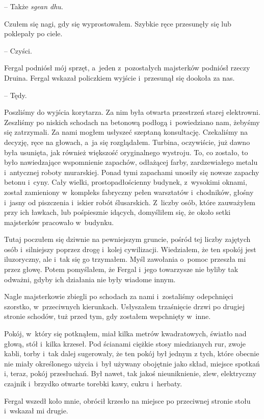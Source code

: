 \documentclass[oneside,polish,11pt,sfheadings]{mwbk}
\begin{document}
-- Także \textit{sgean dhu}.

Czułem się nagi, gdy się wyprostowałem. Szybkie ręce przesunęły się lub
poklepały po ciele.

-- Czyści.

Fergal podniósł mój sprzęt, a~jeden z~pozostałych majsterków podniósł
rzeczy Druina. Fergal wskazał policzkiem wyjście i~przesunął się dookoła
za nas.

-- Tędy.

Poszliśmy do wyjścia korytarza. Za nim była otwarta przestrzeń starej
elektrowni. Zeszliśmy po niskich schodach na betonową podłogą i~powiedziano nam, żebyśmy się zatrzymali. Za nami mogłem usłyszeć
szeptaną konsultację. Czekaliśmy na decyzję, ręce na głowach, a~ja się
rozglądałem. Turbina, oczywiście, już dawno była usunięta, jak również
większość oryginalnego wystroju. To, co zostało, to było nawiedzające
wspomnienie zapachów, odłażącej farby, zardzewiałego metalu i~antycznej
roboty murarskiej. Ponad tymi zapachami unosiły się nowsze zapachy
betonu i~cyny. Cały wielki, prostopadłościenny budynek, z~wysokimi
oknami, został zamieniony w~kompleks fabryczny pełen warsztatów i~chodników, głośny i~jasny od piszczenia i~iskier robót ślusarskich. Z~liczby osób, które zauważyłem przy ich ławkach, lub pośpiesznie idących,
domyśliłem się, że około setki majsterków pracowało w~budynku.

Tutaj poczułem się dziwnie na pewniejszym gruncie, pośród tej liczby
zajętych osób i~silniejszy poprzez drogę i~kolej cywilizacji.
Wiedziałem, że ten spokój jest iluzoryczny, ale i~tak się go trzymałem.
Myśl zawołania o~pomoc przeszła mi przez głowę. Potem pomyślałem, że
Fergal i~jego towarzysze nie byliby tak odważni, gdyby ich działania nie
były wiadome innym.

Nagle majsterkowie zbiegli po schodach za nami i~zostaliśmy odepchnięci
szorstko, w~przeciwnych kierunkach. Usłyszałem trzaśnięcie drzwi po
drugiej stronie schodów, tuż przed tym, gdy zostałem wepchnięty w~inne.

Pokój, w~który się potknąłem, miał kilka metrów kwadratowych, światło
nad głową, stół i~kilka krzeseł. Pod ścianami ciężkie stosy miedzianych
rur, zwoje kabli, torby i~tak dalej sugerowały, że ten pokój był jednym
z tych, które obecnie nie miały określonego użycia i~był używany
obojętnie jako skład, miejsce spotkań i, teraz, pokój przesłuchań. Był
nawet, tak jakoś nieuniknienie, zlew, elektryczny czajnik i~brzydko
otwarte torebki kawy, cukru i~herbaty.

Fergal wszedł koło mnie, obrócił krzesło na miejsce po przeciwnej
stronie stołu i~wskazał mi drugie.
\end{document}
